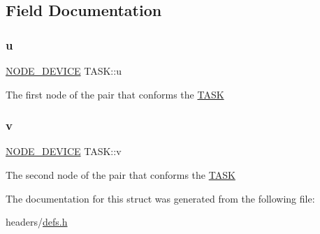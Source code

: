 \subsection{Field Documentation}
\mbox{\label{structTASK_a40c47e76a10f508bc4757b4e79c65ef1}} 
\subsubsection{\texorpdfstring{u}{u}}
{\footnotesize\ttfamily \hyperlink{structNODE__DEVICE}{N\+O\+D\+E\+\_\+\+D\+E\+V\+I\+CE} T\+A\+S\+K\+::u}

The first node of the pair that conforms the \hyperlink{structTASK}{T\+A\+SK} \mbox{\label{structTASK_aa8bc9e3d0203b93cfc0dd927e3972fde}} 
\subsubsection{\texorpdfstring{v}{v}}
{\footnotesize\ttfamily \hyperlink{structNODE__DEVICE}{N\+O\+D\+E\+\_\+\+D\+E\+V\+I\+CE} T\+A\+S\+K\+::v}

The second node of the pair that conforms the \hyperlink{structTASK}{T\+A\+SK} 

The documentation for this struct was generated from the following file\+:\begin{DoxyCompactItemize}
\item 
headers/\hyperlink{defs_8h}{defs.\+h}\end{DoxyCompactItemize}
